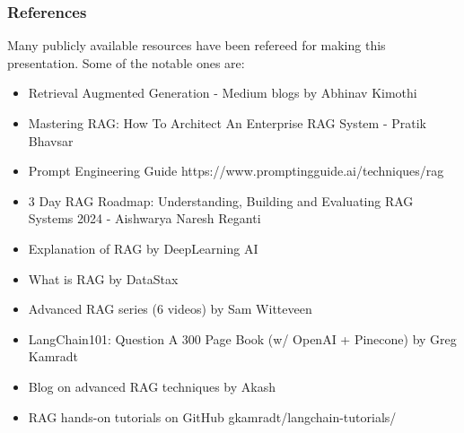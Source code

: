 \begin{frame}\frametitle{References}
Many publicly available resources have been refereed for making this presentation. Some of the notable ones are:
\footnotesize
\begin{itemize}
\item Retrieval Augmented Generation - Medium blogs by Abhinav Kimothi
\item Mastering RAG: How To Architect An Enterprise RAG System - Pratik Bhavsar
\item Prompt Engineering Guide https://www.promptingguide.ai/techniques/rag
\item 3 Day RAG Roadmap: Understanding, Building and Evaluating RAG Systems 2024 - Aishwarya Naresh Reganti
\item Explanation of RAG by DeepLearning AI 
\item What is RAG by DataStax 
\item Advanced RAG series (6 videos) by Sam Witteveen 
\item LangChain101: Question A 300 Page Book (w/ OpenAI + Pinecone) by Greg Kamradt 
\item Blog on advanced RAG techniques by Akash 
\item RAG hands-on tutorials on GitHub gkamradt/langchain-tutorials/

\end{itemize}

\end{frame}